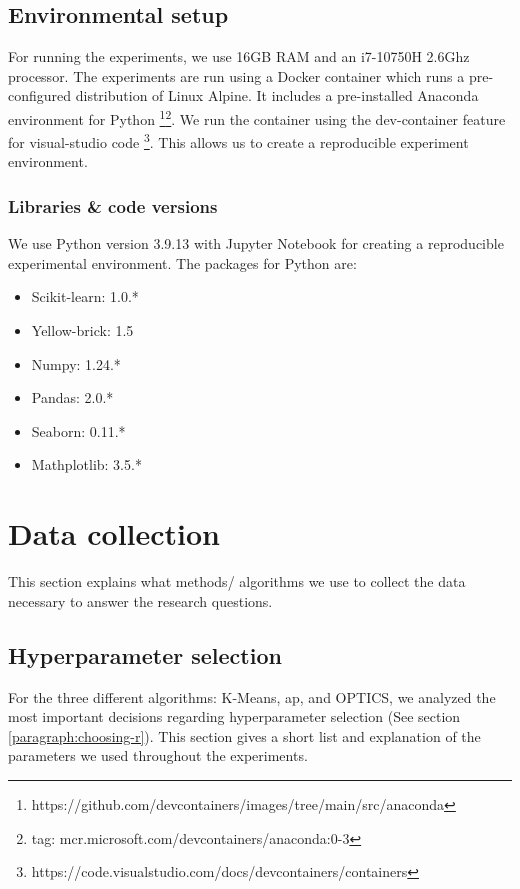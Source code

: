 \subsection{Environmental setup}
For running the experiments, we use 16GB RAM and an i7-10750H 2.6Ghz processor.
The experiments are run using a Docker container which runs a pre-configured distribution of Linux Alpine.
It includes a pre-installed Anaconda environment for Python \footnote{https://github.com/devcontainers/images/tree/main/src/anaconda}\footnote{tag: mcr.microsoft.com/devcontainers/anaconda:0-3}.
We run the container using the dev-container feature for visual-studio code \footnote{https://code.visualstudio.com/docs/devcontainers/containers}.
This allows us to create a reproducible experiment environment.
\subsubsection{Libraries \& code versions}
We use Python version 3.9.13 with Jupyter Notebook for creating a reproducible experimental environment.
The packages for Python are:
\begin{itemize}
      \item Scikit-learn: 1.0.*
      \item Yellow-brick: 1.5
      \item Numpy: 1.24.*
      \item Pandas: 2.0.*
      \item Seaborn: 0.11.*
      \item Mathplotlib: 3.5.*
\end{itemize}

\section{Data collection}
This section explains what methods/ algorithms we use to collect the data necessary to answer the research questions.
\subsection{Hyperparameter selection}
For the three different algorithms: K-Means, \gls{ap}, and OPTICS, we analyzed the most important decisions regarding hyperparameter selection (See section \ref{paragraph:choosing-r}).
This section gives a short list and explanation of the parameters we used throughout the experiments.
